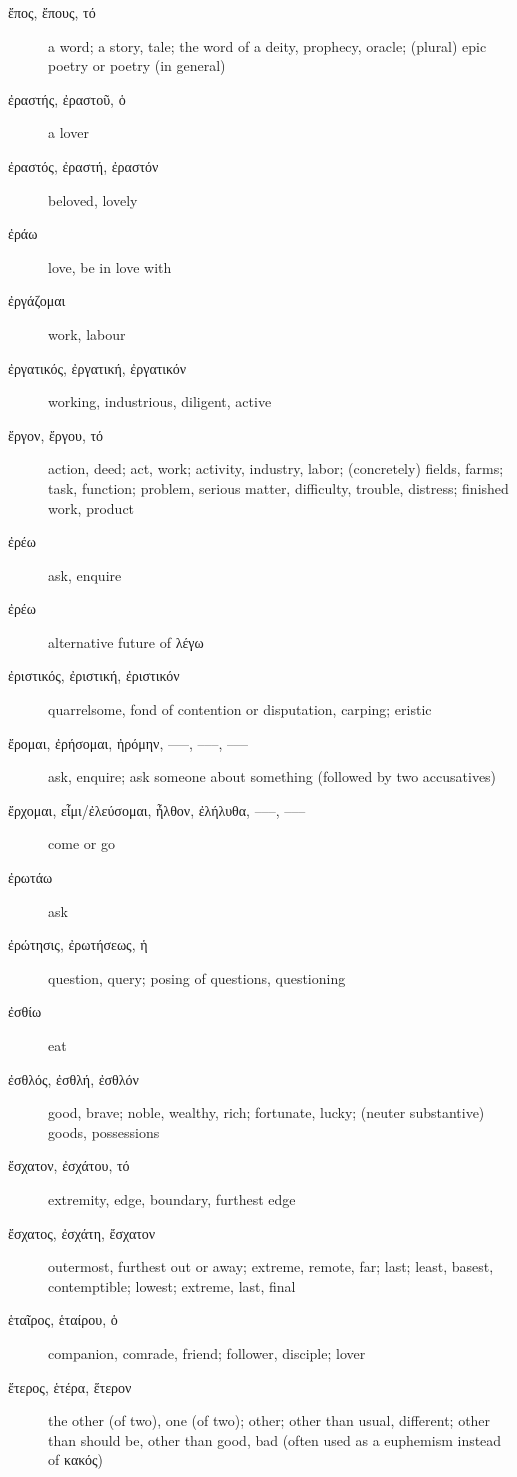 \documentclass[12pt,letterpaper]{article}
\begin{document}
\begin{description}
    \item[\textgreek{ἔπος, ἔπους, τό}] \marginnote{*}a word; a story, tale; the word of a deity, prophecy, oracle; (plural) epic poetry or poetry (in general)
    \item[\textgreek{ἐραστής, ἐραστοῦ, ὁ}] a lover
    \item[\textgreek{ἐραστός, ἐραστή, ἐραστόν}] beloved, lovely
    \item[\textgreek{ἐράω}] love, be in love with
    \item[\textgreek{ἐργάζομαι}] work, labour
    \item[\textgreek{ἐργατικός, ἐργατική, ἐργατικόν}] working, industrious, diligent, active
    \item[\textgreek{ἔργον, ἔργου, τό}] \marginnote{*}action, deed; act, work; activity, industry, labor; (concretely) fields, farms; task, function; problem, serious matter, difficulty, trouble, distress; finished work, product
    \item[\textgreek{ἐρέω}] ask, enquire
    \item[\textgreek{ἐρέω}] alternative future of \textgreek{λέγω}
    \item[\textgreek{ἐριστικός, ἐριστική, ἐριστικόν}] quarrelsome, fond of contention or disputation, carping; eristic
    \item[\textgreek{ἔρομαι, ἐρήσομαι, ἠρόμην, –––, –––, –––}] \marginnote{*}ask, enquire; ask someone about something (followed by two accusatives)
    \item[\textgreek{ἔρχομαι, εἶμι/ἐλεύσομαι, ἦλθον, ἐλήλυθα, –––, –––}] \marginnote{*}come or go
    \item[\textgreek{ἐρωτάω}] ask
    \item[\textgreek{ἐρώτησις, ἐρωτήσεως, ἡ}] question, query; posing of questions, questioning
    \item[\textgreek{ἐσθίω}] eat
    \item[\textgreek{ἐσθλός, ἐσθλή, ἐσθλόν}] good, brave; noble, wealthy, rich; fortunate, lucky; (neuter substantive) goods, possessions
    \item[\textgreek{ἔσχατον, ἐσχάτου, τό}] extremity, edge, boundary, furthest edge
    \item[\textgreek{ἔσχατος, ἐσχάτη, ἔσχατον}] outermost, furthest out or away; extreme, remote, far; last; least, basest, contemptible; lowest; extreme, last, final
    \item[\textgreek{ἑταῖρος, ἑταίρου, ὁ}] \marginnote{*}companion, comrade, friend; follower, disciple; lover
    \item[\textgreek{ἕτερος, ἑτέρα, ἕτερον}] \marginnote{*}the other (of two), one (of two); other; other than usual, different; other than should be, other than good, bad (often used as a euphemism instead of \textgreek{κακός})

\end{description}
\end{document}
